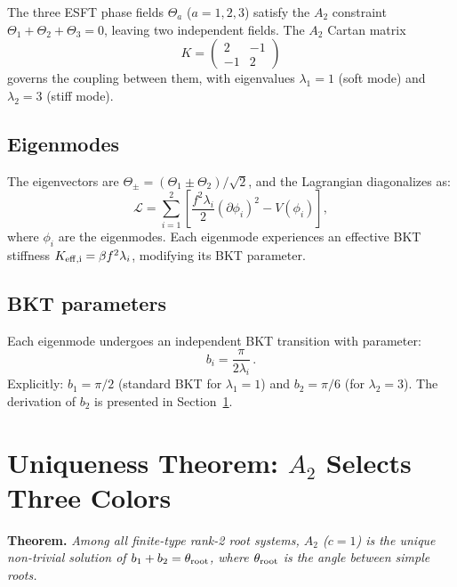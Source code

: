 \documentclass[twocolumn,preprintnumbers,amsmath,amssymb,prd]{revtex4-2}
\begin{document}
The three ESFT phase fields $\Theta_a$ ($a = 1,2,3$) satisfy the $A_2$ constraint $\Theta_1 + \Theta_2 + \Theta_3 = 0$, leaving two independent fields.
The $A_2$ Cartan matrix
\begin{equation}
K = \begin{pmatrix} 2 & -1 \\ -1 & 2 \end{pmatrix}
\label{eq:cartan}
\end{equation}
governs the coupling between them, with eigenvalues $\lambda_1 = 1$ (soft mode) and $\lambda_2 = 3$ (stiff mode).

\subsection{Eigenmodes}

The eigenvectors are $\Theta_\pm = (\Theta_1 \pm \Theta_2)/\sqrt{2}$, and the Lagrangian diagonalizes as:
\begin{equation}
\mathcal{L} = \sum_{i=1}^{2}\left[\frac{f^2\lambda_i}{2}(\partial\phi_i)^2 - V(\phi_i)\right],
\end{equation}
where $\phi_i$ are the eigenmodes.
Each eigenmode experiences an effective BKT stiffness $K_{\rm eff,i} = \beta f^2 \lambda_i$, modifying its BKT parameter.

\subsection{BKT parameters}

Each eigenmode undergoes an independent BKT transition with parameter:
\begin{equation}
b_i = \frac{\pi}{2\lambda_i}\,.
\label{eq:bi}
\end{equation}
Explicitly: $b_1 = \pi/2$ (standard BKT for $\lambda_1 = 1$) and $b_2 = \pi/6$ (for $\lambda_2 = 3$).
The derivation of $b_2$ is presented in Section~\ref{sec:uniqueness}.

\section{Uniqueness Theorem: $A_2$ Selects Three Colors}
\label{sec:uniqueness}

\textbf{Theorem.} \emph{Among all finite-type rank-2 root systems, $A_2$ ($c=1$) is the unique non-trivial solution of $b_1 + b_2 = \theta_{\rm root}$, where $\theta_{\rm root}$ is the angle between simple roots.}
\end{document}
